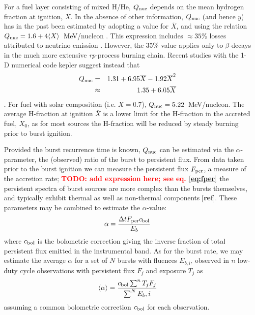 \documentclass{aastex63}
\newcommand{\Xb}{\ensuremath{\overline{X}}}
\newcommand{\qnuc}{Q_{\rm nuc}}
\newcommand{\todo}[1]{\textbf{\textcolor{red}{TODO: #1}}} %
\begin{document}
For a fuel layer consisting of mixed H/He, $\qnuc$ depends on the mean hydrogen fraction at ignition, \Xb. 
%
In the absence of other information, $\qnuc$ (and hence $y$) has in the past been estimated by adopting a value for 
$\Xb$,
%
and using the relation $Q_{\rm nuc}=1.6 + 4\langle X\rangle$~MeV/nucleon \cite[e.g.][and references therein]{gal03d}. This expression includes $\approx35$\% losses
attributed to neutrino emission \cite[]{fuji87}. However, the 35\% value applies only to $\beta$-decays in the much more extensive {\it rp}-process burning chain.
Recent studies with the 1-D numerical code {\sc kepler} suggest instead that 
\begin{eqnarray}
Q_{\rm nuc} &= & 1.31+6.95\Xb-1.92\Xb^2 \nonumber \\
& \approx & 1.35 + 6.05 \Xb
\label{eq:qnuc}
\end{eqnarray}
\cite[]{goodwin19a}.
For fuel with solar composition (i.e. $X=0.7$), $Q_{\rm nuc}=5.22$~MeV/nucleon.
%
The average H-fraction at ignition $\Xb$ is a lower limit for the H-fraction in the accreted fuel, $X_0$, as for most sources the H-fraction will be reduced by steady burning prior to burst ignition.

Provided the burst recurrence time is known, $\qnuc$ can be estimated via the $\alpha$-parameter, the (observed) ratio of the burst to persistent flux.
%
From data taken prior to the burst ignition we can measure the persistent flux $F_{\rm per}$, a measure of the accretion rate; \todo{ add expression here; see eq. \ref{eq:fper}}
the persistent spectra of burst sources are  more complex than the bursts themselves, and typically exhibit thermal as well as non-thermal components [{\bf ref}].
%
These parameters may be combined to estimate the $\alpha$-value: 
\begin{equation}
\alpha = \frac{\Delta t F_{\rm per} c_{\rm bol}}{E_b}
\label{eq:alpha}
\end{equation}
where $c_{\rm bol}$ is the bolometric correction giving the inverse fraction of total persistent flux emitted in the instrumental band.
%
As for the burst rate, we may estimate the average $\alpha$ for a set of $N$ bursts with  
fluences $E_{b,i}$, 
%
observed in $n$ low-duty cycle observations with persistent flux $F_j$ and exposure $T_j$ as
\begin{equation}
\langle \alpha\rangle = \frac{c_{\rm bol}\sum^n T_jF_j}{\sum^N E_b,i}
\label{eq:alphaav}
\end{equation}
assuming a common bolometric correction $c_{\rm bol}$ for each observation.
\end{document}
